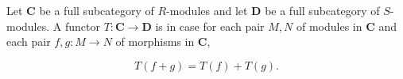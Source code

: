 Let $\mathbf{C}$ be a full subcategory of $R$-modules and let $\mathbf{D}$ be a full subcategory of $S$-modules. A functor $T: \mathbf{C} \to \mathbf{D}$ is  in case for each pair $M, N$ of modules in $\mathbf{C}$ and each pair $f, g: M \to N$ of morphisms in $\mathbf{C}$,

$$T(f + g) = T(f) + T(g).$$
